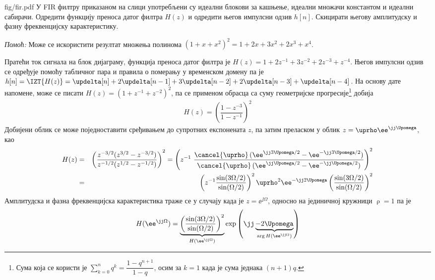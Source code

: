 
\begin{slikaDesno}{fig/fir.pdf}
    \PID У FIR филтру приказаном на слици употребљени су идеални блокови за кашњење, идеални множачи константом и идеални сабирачи.
    Одредити функцију преноса датог филтра $H(z)$ и одредити његов импулсни одзив $h[n]$.
    Скицирати његову амплитудску и фазну фреквенцијску карактеристику.        
\end{slikaDesno}
\textit{Помоћ:} Може се искористити резултат множења полинома $(1 + x + x^2)^2 = 1 + 2x + 3x^2 + 2x^3 + x^4$. 

\RESENJE
Пратећи ток сигнала на блок дијаграму, функција преноса датог филтра је 
$H(z) = 1 + 2 z^{-1} + 3 z^{-2} +  2 z^{-3} + z^{-4}$. Његов импулсни одзив се одређује помоћу 
табличног пара  и правила о померању у временском домену па је 
$h[n] = \IZT{H(z)} = \updelta[n] + 2 \updelta[n-1] + 3\updelta[n-2] + 2\updelta[n-3] + \updelta[n-4]$. 
На основу дате напомене, може се писати $H(z) = (1 + z^{-1} + z^{-2})^2$, па се применом обрасца са суму 
геометријске прогресије\footnote{Сума која се користи је 
$\sum_{k = 0}^n q^k = \dfrac{1 - q^{n+1}}{1 - q}$, осим за  $k = 1$ када је сума једнака $(n+1)q$.
} добија 
\begin{eqnarray}
    H(z) = \left( \dfrac{1 - z^{-3}}{1 - z^{-1}} \right)^2 
\end{eqnarray}
Добијени облик се може поједноставити сређивањем до супротних експонената $z$, па затим преласком 
у облик $z = \uprho \ee^{\jj\Upomega}$, као
\begin{eqnarray}
    H(z) &=& 
    \left( \dfrac{ z^{-3/2} (z^{3/2} - z^{-3/2}) }{ z^{-1/2} (z^{1/2} - z^{-1/2})  } \right)^2
    =
    \left( z^{-1} \,\, \dfrac{ \cancel{\uprho} \, ( \ee^{\jj3\Upomega/2} - \ee^{-\jj3\Upomega/2} ) }{\cancel{\uprho}\,( \ee^{\jj\Upomega/2} - \ee^{-\jj\Upomega/2} )} \right)^2
    \\
    &=&
    \left(
        z^{-1}
        \dfrac{\sin(3\Omega/2)}{\sin(\Omega/2)}
    \right)^2
    \uprho^2 \ee^{-\jj 2\Upomega} 
    \left(
        \dfrac{\sin(3\Omega/2)}{\sin(\Omega/2)}
    \right)^2
\end{eqnarray}
Амплитудска и фазна фреквенцијска карактеристика траже се у случају када је $z = \ee^{\jj\Omega}$, односно на јединичној
кружници $\uprho = 1$ па је 
\begin{eqnarray}
    H(\ee^{\jj\Omega}) = 
    \underbrace{
    \left(
        \dfrac{\sin(3\Omega/2)}{\sin(\Omega/2)}
    \right)^2
    }_{H(\ee^{\jj\Omega})}
    \exp\left(\jj 
    \underbrace{-2\Upomega}_{
        \arg H(\ee^{\jj\Omega})
    } \right)
\end{eqnarray}

